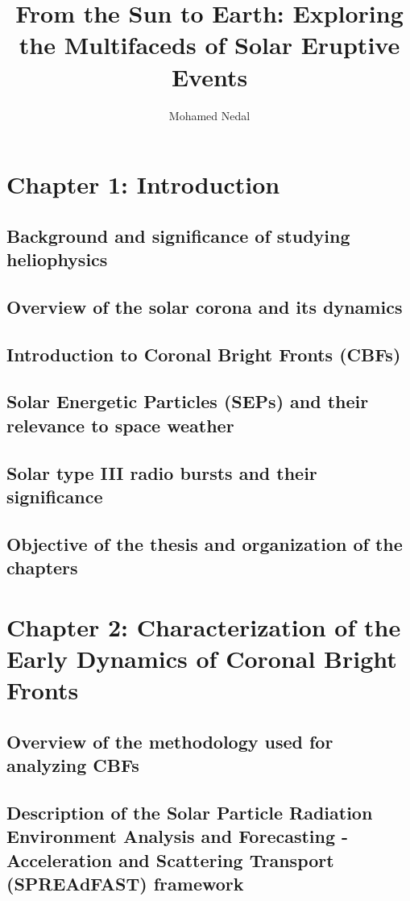 \documentclass{article}
\title{From the Sun to Earth: Exploring the Multifaceds of Solar Eruptive Events}
\author{Mohamed Nedal}
\begin{document}
\maketitle



\section{Chapter 1: Introduction}
\subsection{Background and significance of studying heliophysics}
\subsection{Overview of the solar corona and its dynamics}
\subsection{Introduction to Coronal Bright Fronts (CBFs)}
\subsection{Solar Energetic Particles (SEPs) and their relevance to space weather}
\subsection{Solar type III radio bursts and their significance}
\subsection{Objective of the thesis and organization of the chapters}

\section{Chapter 2: Characterization of the Early Dynamics of Coronal Bright Fronts}
\subsection{Overview of the methodology used for analyzing CBFs}
\subsection{Description of the Solar Particle Radiation Environment Analysis and Forecasting - Acceleration and Scattering Transport (SPREAdFAST) framework}
\end{document}
